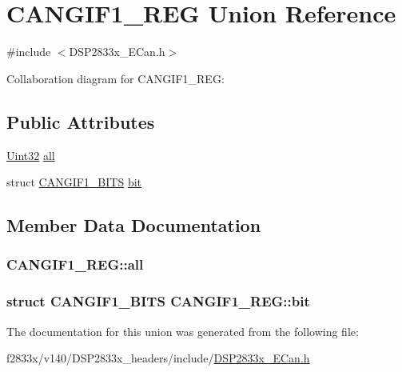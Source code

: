 \hypertarget{union_c_a_n_g_i_f1___r_e_g}{}\section{C\+A\+N\+G\+I\+F1\+\_\+\+R\+E\+G Union Reference}
\label{union_c_a_n_g_i_f1___r_e_g}


{\ttfamily \#include $<$D\+S\+P2833x\+\_\+\+E\+Can.\+h$>$}



Collaboration diagram for C\+A\+N\+G\+I\+F1\+\_\+\+R\+E\+G\+:
\subsection*{Public Attributes}
\begin{DoxyCompactItemize}
\item 
\hyperlink{_d_s_p2833x___device_8h_aba99025e657f892beb7ff31cecf64653}{Uint32} \hyperlink{union_c_a_n_g_i_f1___r_e_g_a4bcec1d2ab9dbb41e1de6ab8f9e0e304}{all}
\item 
struct \hyperlink{struct_c_a_n_g_i_f1___b_i_t_s}{C\+A\+N\+G\+I\+F1\+\_\+\+B\+I\+T\+S} \hyperlink{union_c_a_n_g_i_f1___r_e_g_a72bf4b3d9d1616660e881770a9eafd7c}{bit}
\end{DoxyCompactItemize}


\subsection{Member Data Documentation}
\hypertarget{union_c_a_n_g_i_f1___r_e_g_a4bcec1d2ab9dbb41e1de6ab8f9e0e304}{}
\subsubsection[{all}]{ C\+A\+N\+G\+I\+F1\+\_\+\+R\+E\+G\+::all}\label{union_c_a_n_g_i_f1___r_e_g_a4bcec1d2ab9dbb41e1de6ab8f9e0e304}
\hypertarget{union_c_a_n_g_i_f1___r_e_g_a72bf4b3d9d1616660e881770a9eafd7c}{}
\subsubsection[{bit}]{\setlength{\rightskip}{0pt plus 5cm}struct {\bf C\+A\+N\+G\+I\+F1\+\_\+\+B\+I\+T\+S} C\+A\+N\+G\+I\+F1\+\_\+\+R\+E\+G\+::bit}\label{union_c_a_n_g_i_f1___r_e_g_a72bf4b3d9d1616660e881770a9eafd7c}


The documentation for this union was generated from the following file\+:\begin{DoxyCompactItemize}
\item 
f2833x/v140/\+D\+S\+P2833x\+\_\+headers/include/\hyperlink{_d_s_p2833x___e_can_8h}{D\+S\+P2833x\+\_\+\+E\+Can.\+h}\end{DoxyCompactItemize}
